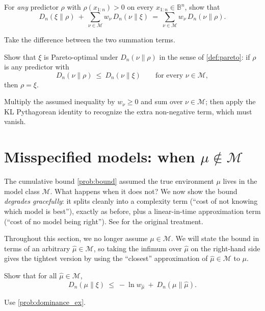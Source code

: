 \documentclass[fontsize=11pt, parskip=half]{scrartcl}
\newcommand{\Mc}{\mathcal{M}}
\begin{document}
\begin{exercise}
\label{prob:kl_pythag}



For \emph{any} predictor $\rho$ with $\rho(x_{1:n}) > 0$ on every $x_{1:n} \in \mathbb{B}^n$, show that
\[
  D_n(\xi \parallel \rho) ~+~ \sum_{\nu \in \Mc} w_\nu \, D_n(\nu \parallel \xi)
  ~=~ \sum_{\nu \in \Mc} w_\nu \, D_n(\nu \parallel \rho).
\]


\begin{hint}
Take the difference between the two summation terms.
\end{hint}
\end{exercise}


\begin{exercise}
\label{prob:kl_pareto}



Show that $\xi$ is Pareto-optimal under $D_n(\nu \parallel \rho)$ in the sense of \cref{def:pareto}: if $\rho$ is any predictor with
\[
  D_n(\nu \parallel \rho) ~\leq~ D_n(\nu \parallel \xi) \qquad \text{for every } \nu \in \Mc,
\]
then $\rho = \xi$.

\begin{hint}
Multiply the assumed inequality by $w_\nu \geq 0$ and sum over
$\nu \in \Mc$; then apply the KL Pythagorean identity to recognize the extra
non-negative term, which must vanish.
\end{hint}
\end{exercise}



\section{Misspecified models: when $\mu \notin \Mc$}\label{prob:misspec}

The cumulative bound \cref{prob:bound} assumed the true environment $\mu$ lives
in the model class $\Mc$. What happens when it does not? We now show the
bound \emph{degrades gracefully}: it splits cleanly into a complexity term
(``cost of not knowing which model is best''), exactly as before, plus a
linear-in-time approximation term (``cost of no model being right''). See \cite[\S3.2.8]{Hutter:04uaibook} for the original treatment.

Throughout this section, we no longer assume $\mu \in \Mc$. 
We will state the bound in terms of an arbitrary
$\hat\mu \in \Mc$, so taking the infimum over $\hat\mu$ on the
right-hand side gives the tightest version by using the ``closest''
approximation of $\hat{\mu} \in \Mc$ to $\mu$.
\begin{exercise}
\label{prob:misspec_ex}



Show that for all $\hat\mu \in \Mc$,
\[
  D_n(\mu \parallel \xi) ~\leq~ -\ln w_{\hat\mu} ~+~ D_n(\mu \parallel \hat\mu).
\]

\begin{hint}
Use \cref{prob:dominance_ex}.
\end{hint}
\end{exercise}
\end{document}
